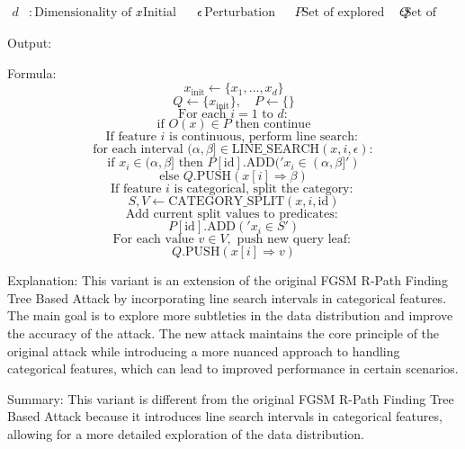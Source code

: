 \begin{align*}
d &: \text{Dimensionality of the input space} \
x &: \text{Initial input sample} \
\epsilon &: \text{Perturbation bound for line search} \
P &: \text{Set of explored leaves with corresponding predicates} \
Q &: \text{Set of queries for unprocessed leaves}
\end{align*}

Output: 

Formula:
\[
x_{\text{init}} \leftarrow \{x_1, \ldots, x_d\}
\]
\[
Q \leftarrow \{x_{\text{init}}\}, \quad P \leftarrow \{\}
\]
\[
\text{For each } i = 1 \text{ to } d:
\]
\[
\text{if } O(x) \in P \text{ then continue}
\]
\[
\text{If feature } i \text{ is continuous, perform line search: }
\]
\[
\text{for each interval } (\alpha, \beta] \in \text{LINE\_SEARCH}(x, i, \epsilon):
\]
\[
\text{if } x_i \in (\alpha, \beta] \text{ then } P[\text{id}].\text{ADD}('x_i \in (\alpha, \beta]')
\]
\[
\text{else } Q.\text{PUSH}(x[i] \Rightarrow \beta)
\]
\[
\text{If feature } i \text{ is categorical, split the category: }
\]
\[
S, V \leftarrow \text{CATEGORY\_SPLIT}(x, i, \text{id})
\]
\[
\text{Add current split values to predicates: }
\]
\[
P[\text{id}].\text{ADD}('x_i \in S')
\]
\[
\text{For each value } v \in V, \text{ push new query leaf: }
\]
\[
Q.\text{PUSH}(x[i] \Rightarrow v)
\]

Explanation: This variant is an extension of the original FGSM R-Path Finding Tree Based Attack by incorporating line search intervals in categorical features. The main goal is to explore more subtleties in the data distribution and improve the accuracy of the attack. The new attack maintains the core principle of the original attack while introducing a more nuanced approach to handling categorical features, which can lead to improved performance in certain scenarios.

Summary: This variant is different from the original FGSM R-Path Finding Tree Based Attack because it introduces line search intervals in categorical features, allowing for a more detailed exploration of the data distribution.